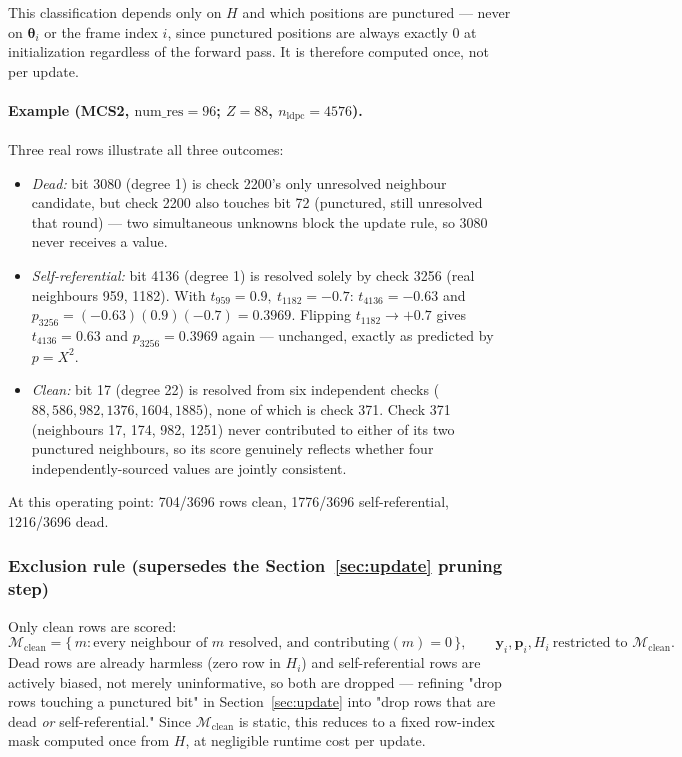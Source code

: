\documentclass{article}
\newcommand{\state}{\boldsymbol{\theta}}
\begin{document}
This classification depends only on $H$ and which positions are punctured — never on
$\state_i$ or the frame index $i$, since punctured positions are always exactly $0$ at
initialization regardless of the forward pass. It is therefore computed once, not per update.

\paragraph{Example (MCS2, $\text{num\_res}=96$; $Z=88$, $n_{\text{ldpc}}=4576$).} Three real
rows illustrate all three outcomes:
\begin{itemize}[itemsep=2pt]
  \item \emph{Dead:} bit 3080 (degree 1) is check 2200's only unresolved neighbour candidate,
  but check 2200 also touches bit 72 (punctured, still unresolved that round) — two
  simultaneous unknowns block the update rule, so 3080 never receives a value.
  \item \emph{Self-referential:} bit 4136 (degree 1) is resolved solely by check 3256 (real
  neighbours 959, 1182). With $t_{959}=0.9,\ t_{1182}=-0.7$: $t_{4136}=-0.63$ and
  $p_{3256}=(-0.63)(0.9)(-0.7)=0.3969$. Flipping $t_{1182}\to+0.7$ gives $t_{4136}=0.63$ and
  $p_{3256}=0.3969$ again — unchanged, exactly as predicted by $p=X^2$.
  \item \emph{Clean:} bit 17 (degree 22) is resolved from six independent checks
  ($88,586,982,1376,1604,1885$), none of which is check 371. Check 371 (neighbours
  17, 174, 982, 1251) never contributed to either of its two punctured neighbours, so its
  score genuinely reflects whether four independently-sourced values are jointly consistent.
\end{itemize}
At this operating point: 704/3696 rows clean, 1776/3696 self-referential, 1216/3696 dead.

\subsubsection*{Exclusion rule (supersedes the Section~\ref{sec:update} pruning step)}

Only clean rows are scored:
\begin{equation}
\mathcal{M}_{\text{clean}} = \{\, m : \text{every neighbour of } m \text{ resolved, and }
\text{contributing}(m)=0 \,\}, \qquad
\mathbf{y}_i, \mathbf{p}_i, H_i \ \text{restricted to } \mathcal{M}_{\text{clean}}.
\end{equation}
Dead rows are already harmless (zero row in $H_i$) and self-referential rows are actively
biased, not merely uninformative, so both are dropped — refining "drop rows touching a
punctured bit" in Section~\ref{sec:update} into "drop rows that are dead \emph{or} self-referential." Since
$\mathcal{M}_{\text{clean}}$ is static, this reduces to a fixed row-index mask computed once
from $H$, at negligible runtime cost per update.
\end{document}
